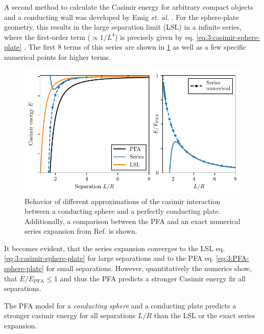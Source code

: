 A second method to calculate the Casimir energy for arbitrary compact objects and a conducting wall was developed by Emig \textit{et. al.} \cite{Emig_2007}. For the sphere-plate geometry, this results in the large separation limit (LSL) in a infinite series, where the first-order term ($\propto 1/L^4$) is precisely given by eq. \eqref{eq:3:casimir-sphere-plate} \cite{Emig_2007a,Pirozhenko_2013}. The first 8 terms of this series are shown in \cref{fig:3:casimir-behavior} as well as a few specific numerical points for higher terms.
\begin{figure}[!ht]
  \centering
  \includegraphics[width=\textwidth]{./../figures/casimir/casimir-behavior.pdf}
  \caption{Behavior of different approximations of the casimir interaction between a conducting sphere and a perfectly conducting plate. Additionally, a comparison between the PFA and an exact numerical series expansion from Ref. \cite{Emig_2007a} is shown.}
  \label{fig:3:casimir-behavior}
\end{figure}
It becomes evident, that the series expansion converges to the LSL eq. \eqref{eq:3:casimir-sphere-plate} for large separations and to the PFA eq. \eqref{eq:3:PFA-sphere-plate} for small separations.
However, quantitatively the numerics show, that $E/E_\mathrm{PFA} \leq 1$ and thus the PFA predicts a stronger Casimir energy fir all separations.
\begin{theorem}
  The PFA model for a \emph{conducting sphere} and a conducting plate predicts a stronger casimir energy for all separations $L/R$ than the LSL or the exact series expansion.
\end{theorem}
